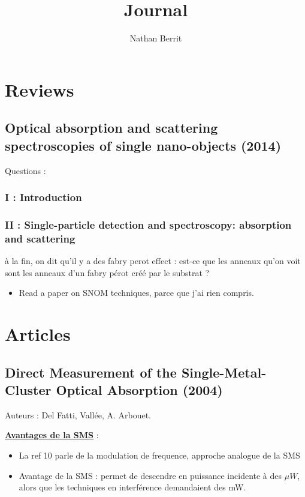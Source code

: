 \documentclass{article}
\title{Journal} %
\author{Nathan Berrit}
\begin{document}
\maketitle %



\section{Reviews}

\subsection*{Optical absorption and scattering spectroscopies of single nano-objects (2014)}
Questions :


\subsubsection*{I : Introduction}

\subsubsection*{II : Single-particle detection and spectroscopy: absorption and scattering}

à la fin, on dit qu'il y a des fabry perot effect : est-ce que les anneaux qu'on voit sont les anneaux d'un fabry pérot créé par le substrat ?

\begin{itemize}
    \item Read a paper on SNOM techniques, parce que j'ai rien compris.
\end{itemize}


\section{Articles}

\subsection*{Direct Measurement of the Single-Metal-Cluster Optical Absorption (2004)}

Auteurs : Del Fatti, Vallée, A. Arbouet.

\underline{\textbf{Avantages de la SMS}} :
\begin{itemize}
    \item La ref 10 parle de la modulation de frequence, approche analogue de la SMS
    \item Avantage de la SMS : permet de descendre en puissance incidente à des $\mu W$, alors que les techniques en interférence demandaient des mW.
\end{itemize}
\end{document}
